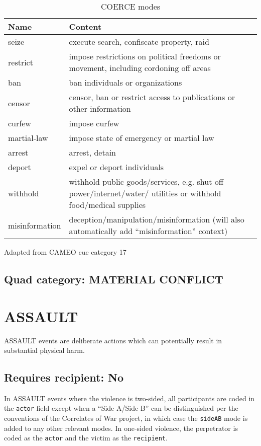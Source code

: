 \documentclass[11pt]{report}
\newcommand{\plcat}[1]{\textsf{#1}}
\newcommand{\plmod}[1]{\texttt{#1}}
\newcommand{\txt}[1]{\texttt{#1}}
\begin{document}
\begin{table}[htp]
\caption{COERCE modes}
\begin{center}
\begin{tabular}{|p{}|L{.73\textwidth}|}
\hline
Name & Content \\
\hline
seize & execute search, confiscate property, raid \\
restrict & impose restrictions on political freedoms or movement, including cordoning off areas \\
ban & ban individuals or organizations \\
censor & censor, ban or restrict access to publications or other information  \\
curfew & impose curfew \\
martial-law & impose state of emergency or martial law \\
arrest & arrest, detain  \\
deport & expel or deport individuals \\
withhold & withhold public goods/services, e.g. shut off power/internet/water/ utilities or withhold food/medical supplies \\
misinformation & deception/manipulation/misinformation (will also automatically add ``misinformation'' context) \\
\hline
\end{tabular}
\end{center}
\label{tab:coerce}
Adapted from CAMEO cue category 17
\end{table}%


\subsection{Quad category: MATERIAL CONFLICT}

\newpage


\section{ASSAULT}

\plcat{ASSAULT} events are deliberate actions which can potentially result in substantial physical harm.

\subsection{Requires recipient: No}

In \plcat{ASSAULT} events where the violence is two-sided, all participants are coded in the \txt{actor} field except when a ``Side A/Side B'' can be distinguished per the conventions of the Correlates of War project, in which case the \plmod{sideAB} mode is added to any other relevant modes. In one-sided violence, the perpetrator is coded as the \txt{actor} and the victim as the \txt{recipient}.
\end{document}
